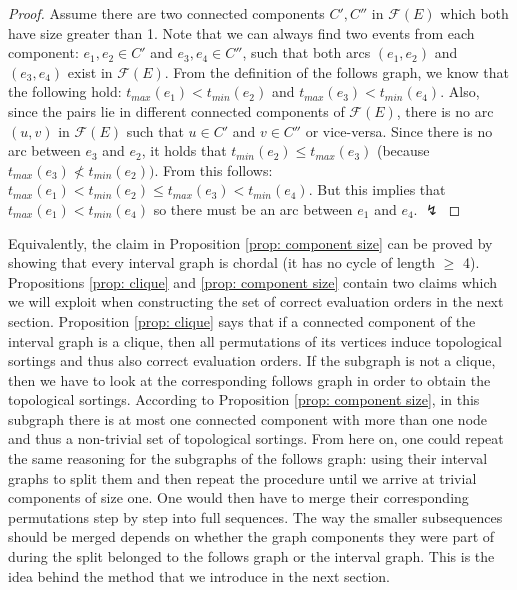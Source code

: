 \begin{proof}
Assume there are two connected components $C', C''$ in $\mathcal{F}(E)$ which both have size greater than 1.
Note that we can always find two events from each component: $e_1, e_2 \in C'$ and $e_3, e_4 \in C''$,
such that both arcs $(e_1,e_2)$ and $(e_3,e_4)$ exist in $\mathcal{F}(E)$.
From the definition of the follows graph, we know that the following hold: 
$t_{max}(e_1) < t_{min}(e_2)$ and $t_{max}(e_3) < t_{min}(e_4)$.
Also, since the pairs lie in different connected components of $\mathcal{F}(E)$, there is no arc $(u,v)$ in $\mathcal{F}(E)$ such that $u \in C'$ and $v \in C''$ or vice-versa.
Since there is no arc between $e_3$ and $e_2$, it holds that $t_{min}(e_2) \leq t_{max}(e_3)$ (because $t_{max}(e_3) \not < t_{min}(e_2))$. 
From this follows:
$t_{max}(e_1) < t_{min}(e_2) \leq t_{max}(e_3) < t_{min}(e_4)$.
But this implies that $t_{max}(e_1) < t_{min}(e_4)$ so there must be an arc between $e_1$ and $e_4$.
$\lightning$
\end{proof}
Equivalently, the claim in Proposition \ref{prop: component size} can be proved by showing that every interval graph is chordal (it has no cycle of length $\geq$ 4).
Propositions \ref{prop: clique} and \ref{prop: component size} contain two claims which we will exploit when constructing the set of correct evaluation orders in the next section.
Proposition \ref{prop: clique} says that if a connected component of the interval graph is a clique, then all permutations of its vertices induce topological sortings and thus also correct evaluation orders.
If the subgraph is not a clique, then we have to look at the corresponding follows graph in order to obtain the topological sortings.
According to Proposition \ref{prop: component size}, in this subgraph there is at most one connected component with more than one node and thus a non-trivial set of topological sortings. 
From here on, one could repeat the same reasoning for the subgraphs of the follows graph: using their interval graphs to split  them and then repeat the procedure until we arrive at trivial components of size one.
One would then have to merge their corresponding permutations step by step into full sequences.
The way the smaller subsequences should be merged depends on whether the graph components they were part of during the split belonged to the follows graph or the interval graph.
This is the idea behind the method that we introduce in the next section.
%
%
%
%

